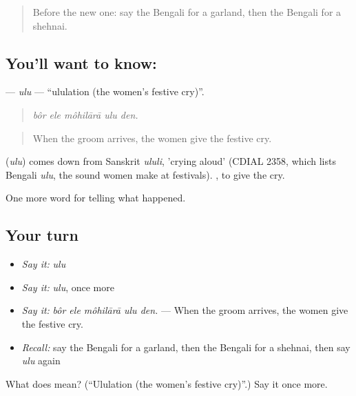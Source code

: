 \begin{quote}
Before the new one: say the Bengali for a garland, then the Bengali for a shehnai.
\end{quote}

\subsection*{You'll want to know: }
\textbf{} — \emph{ulu} — \textquotedblleft{}ululation (the women's festive cry)\textquotedblright{}.

\begin{quote}
    
\end{quote}

\begin{quote}
\emph{bôr ele môhilārā ulu den.}
\end{quote}

\begin{quote}
When the groom arrives, the women give the festive cry.
\end{quote}

\begin{cousinweb}
\textbf{} (\emph{ulu}) comes down from Sanskrit \emph{ululi}, 'crying aloud' (CDIAL 2358, which lists Bengali \emph{ulu}, the sound women make at festivals).  , to give the cry.
\end{cousinweb}

\begin{grammarlens}[title={What you've built}]
One more word for telling what happened.
\end{grammarlens}

\subsection*{Your turn}
\begin{itemize}
\raggedright
  \item \emph{Say it:} \emph{ulu}
  \item \emph{Say it:} \emph{ulu}, once more
  \item \emph{Say it:} \emph{bôr ele môhilārā ulu den.} — When the groom arrives, the women give the festive cry.
  \item \emph{Recall:} say the Bengali for a garland, then the Bengali for a shehnai, then say \emph{ulu} again
\end{itemize}

\begin{tcolorbox}[breakable,colback=teal!4,colframe=teal!35!black,title={Before you move on}]
What does  mean? (\textquotedblleft{}Ululation (the women's festive cry)\textquotedblright{}.) Say it once more.
\end{tcolorbox}
